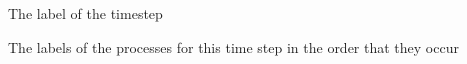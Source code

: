 
 {The label of the timestep}

 {The labels of the processes for this time step in the order that they occur}


